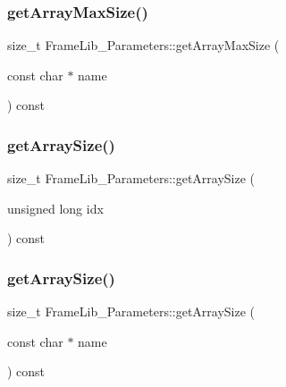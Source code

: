 \subsubsection{\texorpdfstring{get\+Array\+Max\+Size()}{getArrayMaxSize()}\hspace{0.1cm}{\footnotesize\ttfamily [2/2]}}
{\footnotesize\ttfamily size\+\_\+t Frame\+Lib\+\_\+\+Parameters\+::get\+Array\+Max\+Size (\begin{DoxyParamCaption}\item[{const char $\ast$}]{name }\end{DoxyParamCaption}) const\hspace{0.3cm}{\ttfamily [inline]}}

\mbox{\label{class_frame_lib___parameters_a393371aad3079281d84150f9343b8e88}} 
\subsubsection{\texorpdfstring{get\+Array\+Size()}{getArraySize()}\hspace{0.1cm}{\footnotesize\ttfamily [1/2]}}
{\footnotesize\ttfamily size\+\_\+t Frame\+Lib\+\_\+\+Parameters\+::get\+Array\+Size (\begin{DoxyParamCaption}\item[{unsigned long}]{idx }\end{DoxyParamCaption}) const\hspace{0.3cm}{\ttfamily [inline]}}

\mbox{\label{class_frame_lib___parameters_a6aab87bc340522a457d3275728d6ad69}} 
\subsubsection{\texorpdfstring{get\+Array\+Size()}{getArraySize()}\hspace{0.1cm}{\footnotesize\ttfamily [2/2]}}
{\footnotesize\ttfamily size\+\_\+t Frame\+Lib\+\_\+\+Parameters\+::get\+Array\+Size (\begin{DoxyParamCaption}\item[{const char $\ast$}]{name }\end{DoxyParamCaption}) const\hspace{0.3cm}{\ttfamily [inline]}}


